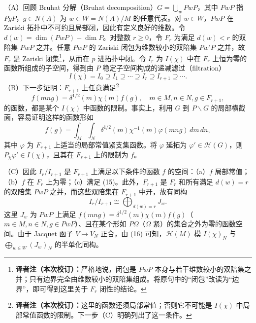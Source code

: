 （A）回顾 Bruhat 分解（Bruhat decomposition）$G=\bigcup_wPwP$，其中 $PwP$ 指 $PgP$，$g\in N(A)$ 为 $w\in W=N(A)/M$ 的任意代表。对 $w\in W$，$PwP$ 在 Zariski 拓扑中不可约且局部闭，因此有定义良好的维数。令 $d(w)=\dim(PwP)-\dim P$。对整数 $r\geq0$，令 $F_r$ 为满足 $d(w)<r$ 的双陪集 $PwP$ 之并。任意 $PwP$ 的 Zariski 闭包为维数较小的双陪集 $Pw'P$ 之并，故 $F_r$ 是 Zariski 闭集\footnote{\textbf{译者注（本次校订）：}严格地说，闭包是 $PwP$ 本身与若干维数较小的双陪集之并；只有边界完全由维数较小的双陪集组成。将原句中的“闭包”改读为“边界”，即可得到这里关于 $F_r$ 闭性的结论。}，从而在 $p$ 进拓扑中闭。令 $I_r$ 为 $I(\chi)$ 中在 $F_r$ 上恒为零的函数所组成的子空间，得到由 $P$ 稳定子空间构成的递减滤过（filtration）
\[
I(\chi)=I_0\supseteq I_1\supseteq\cdots\supseteq I_r\supseteq I_{r+1}\supseteq\cdots.\tag{14}
\]
（B）下一步证明：$F_{r+1}$ 上任意满足\footnote{\textbf{译者注（本次校订）：}这里的函数还须局部常值；否则它不可能是 $I(\chi)$ 中局部常值函数的限制。下一步（C）明确列出了这一条件。}
\[
f(mng)=\delta^{1/2}(m)\chi(m)f(g),\quad m\in M,n\in N,g\in F_{r+1},\tag{15}
\]
的函数，都是某个 $I(\chi)$ 中函数的限制。事实上，利用 $G$ 到 $P\backslash G$ 的局部横截面，容易证明这样的函数形如
\[
f(g)=\int_M\int_N\delta^{1/2}(m)\chi^{-1}(m)\varphi(mng)\,dm\,dn,
\]
其中 $\varphi$ 为 $F_{r+1}$ 上适当的局部常值紧支集函数。将 $\varphi$ 延拓为 $\varphi'\in\mathcal H(G)$，则 $P_\chi\varphi'\in I(\chi)$，且其在 $F_{r+1}$ 上的限制为 $f$。

（C）因此 $I_r/I_{r+1}$ 是 $F_{r+1}$ 上满足以下条件的函数 $f$ 的空间：（a）$f$ 局部常值；（b）$f$ 在 $F_r$ 上为零；（c）满足 (15)。此外，$F_{r+1}$ 是 $F_r$ 和所有满足 $d(w)=r$ 的双陪集 $PwP$ 之并，而这些双陪集在 $F_{r+1}$ 中开，故有同构
\[
I_r/I_{r+1}\cong\bigoplus_{d(w)=r}J_w.\tag{16}
\]
这里 $J_w$ 为 $PwP$ 上满足 $f(mng)=\delta^{1/2}(m)\chi(m)f(g)$（$m\in M,n\in N,g\in PwP$）、且在某个形如 $P\Omega$（$\Omega$ 紧）的集合之外为零的函数空间。由于 Jacquet 函子 $V\mapsto V_N$ 正合，由 (16) 可知，$\mathcal H(M)$ 模 $I(\chi)_N$ 与 $\bigoplus_{w\in W}(J_w)_N$ 的半单化同构。

